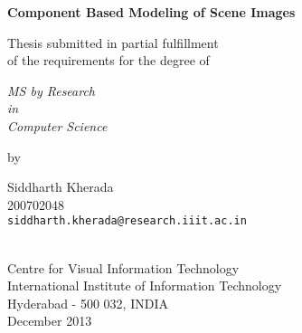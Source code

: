 \thispagestyle{empty}
\begin{center}
\vspace*{1.5cm}
{\Large \bf Component Based Modeling of Scene Images}

\vspace*{3.75cm}
{\large Thesis submitted in partial fulfillment\\}
{\large  of the requirements for the degree of \\}

\vspace*{1cm}
{\it {\large MS by Research} \\
{\large in\\}
{\large Computer Science\\}}

\vspace*{1cm}
{\large by}

\vspace*{5mm}
{\large Siddharth Kherada\\}
{\large 200702048\\
{\small \tt siddharth.kherada@research.iiit.ac.in}}


\vspace*{4.0cm}
{\\}
{\large Centre for Visual Information Technology\\}
{\large International Institute of Information Technology\\}
{\large Hyderabad - 500 032, INDIA\\}
{\large December 2013\\}
\end{center}